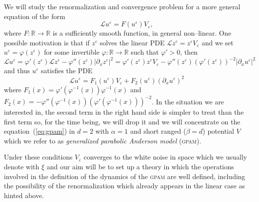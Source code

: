 \documentclass[a4paper,11pt]{article}
\newcommand{\tmem}[1]{{\em #1\/}}
\newcommand{\tmname}[1]{\textsc{#1}}
\newcommand{\LL}{\mathscr{L}}
\begin{document}
We will study the renormalization and convergence problem for a more general
equation of the form
\begin{equation}
  \LL u^{\varepsilon} = F (u^{\varepsilon}) V_{\varepsilon}, \label{eq:gpam}
\end{equation}
where $F : \mathbb{R} \rightarrow \mathbb{R}$ is a sufficiently smooth
function, in general non--linear. One possible motivation is that if $z^{\varepsilon}$ solves
the linear PDE $\LL z^\varepsilon = z^\varepsilon V_\varepsilon$ and we set $u^{\varepsilon} = \varphi (z^{\varepsilon})$ for
some invertible $\varphi : \mathbb{R} \rightarrow \mathbb{R}$ such that
$\varphi' > 0$, then
\[ \LL u^{\varepsilon} = \varphi' (z^{\varepsilon}) \LL z^{\varepsilon} -
   \varphi'' (z^{\varepsilon}) | \partial_x z^{\varepsilon} |^2 = \varphi'
   (z^{\varepsilon}) z^{\varepsilon} V_{\varepsilon} - \varphi''
   (z^{\varepsilon}) (\varphi' (z^{\varepsilon}))^{- 2} | \partial_x
   u^{\varepsilon} |^2 \]
and thus $u^{\varepsilon}$ satisfies the PDE
\[ \LL u^{\varepsilon} = F_1 (u^{\varepsilon}) V_{\varepsilon} + F_2
   (u^{\varepsilon}) (\partial_x u^{\varepsilon})^2 \]
where $F_1 (x) = \varphi' (\varphi^{- 1} (x)) \varphi^{- 1} (x)$ and $F_2 (x)
= - \varphi'' (\varphi^{- 1} (x)) (\varphi' (\varphi^{- 1} (x)))^{- 2}$. In
the situation we are interested in, the second term in the right hand side is
simpler to treat than the first term so, for the time being, we will drop it
and we will concentrate on the equation~(\ref{eq:gpam}) in $d = 2$ with
$\alpha = 1$ and short ranged ($\beta = d$) potential $V$ which we refer to as
{\tmem{generalized parabolic Anderson model}} ({\tmname{gpam}}).

Under these conditions $V_{\varepsilon}$ converges to the white noise in
space which we usually denote with $\xi$ and our aim will be to set up a
theory in which the operations involved in the definition of the
dynamics of the {\tmname{gpam}} are well defined, including the possibility of
the renormalization which already appears in the linear case as hinted above.
\end{document}
